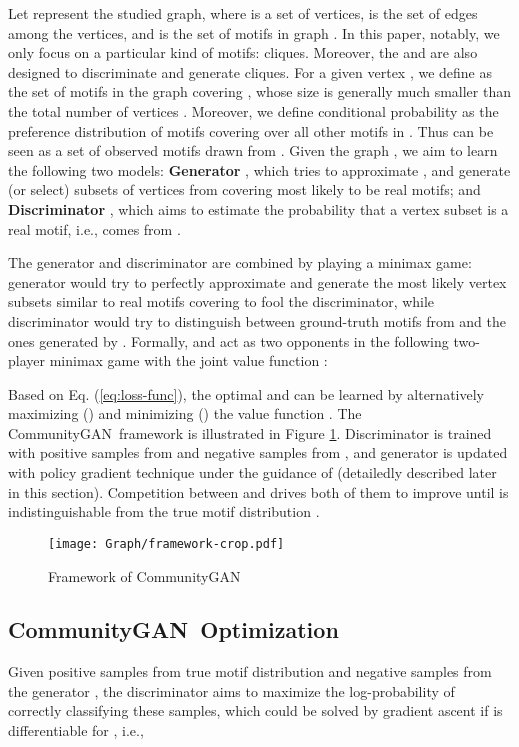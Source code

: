 \documentclass[sigconf]{acmart}
\newcommand{\ComGAN}{CommunityGAN}
\begin{document}
Let  represent the studied graph, where  is a set of vertices,  is the set of edges among the vertices, and  is the set of motifs in graph .
In this paper, notably, we only focus on a particular kind of motifs: cliques.
Moreover, the  and  are also designed to discriminate and generate cliques.
For a given vertex , we define  as the set of motifs in the graph covering , whose size is generally much smaller than the total number of vertices .
Moreover, we define conditional probability  as the preference distribution of motifs covering  over all other motifs in .
Thus  can be seen as a set of observed motifs drawn from .
Given the graph , we aim to learn the following two models:
\textbf{Generator} , which tries to approximate , and generate (or select) subsets of vertices from  covering  most likely to be real motifs; and
\textbf{Discriminator} , which aims to estimate the probability that a vertex subset  is a real motif, i.e., comes from .

The generator  and discriminator  are combined by playing a minimax game:
generator  would try to perfectly approximate  and generate the most likely vertex subsets similar to real motifs covering  to fool the discriminator,
while discriminator  would try to distinguish between ground-truth motifs from  and the ones generated by .
Formally,  and  act as two opponents in the following two-player minimax game with the joint value function :


Based on Eq. (\ref{eq:loss-func}), the optimal  and  can be learned by alternatively maximizing () and minimizing () the value function .
The \ComGAN~framework is illustrated in Figure \ref{fig:framework}.
Discriminator  is trained with positive samples from  and negative samples from , and generator  is updated with policy gradient technique \cite{sutton2000policy} under the guidance of  (detailedly described later in this section).
Competition between  and  drives both of them to improve until  is indistinguishable from the true motif distribution .



\begin{figure}[tbp]
\texttt{[image: Graph/framework-crop.pdf]}
\caption{Framework of \ComGAN}
\label{fig:framework}
\end{figure}


\subsection{\ComGAN~Optimization}
Given positive samples from true motif distribution  and negative samples from the generator , the discriminator aims to maximize the log-probability of correctly classifying these samples, which could be solved by gradient ascent if  is differentiable for , i.e.,
\end{document}
